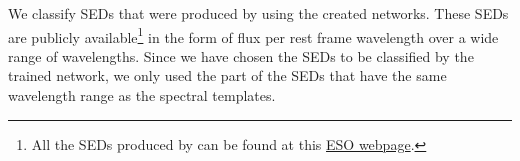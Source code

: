     We classify SEDs that were produced by  using the created networks.
    These SEDs are publicly available\footnote{All the SEDs produced by   can be found at this \href{http://telbib.eso.org/detail.php?bibcode=2012AJ....144..172T}{ESO webpage}.} in the form of flux per rest frame wavelength over a wide range of wavelengths.
    Since we have chosen the  SEDs to be classified by the trained network, we only used the part of the SEDs that have the same wavelength range as the  spectral templates.
